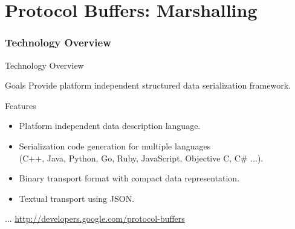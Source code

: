 \part{Protocol Buffers: Marshalling}


\section{Technology Overview}




\begin{frame}{Technology Overview}
    \begin{block}{Goals}
        Provide platform independent structured data serialization framework.
    \end{block}

    \bigskip

    \begin{block}{Features}
        \begin{itemize}
            \item Platform independent data description language.
            \item Serialization code generation for multiple languages \\
                  (C++, Java, Python, Go, Ruby, JavaScript, Objective C, C\# ...).
            \item Binary transport format with compact data representation.
            \item Textual transport using JSON.
        \end{itemize}
    \end{block}

    \bigskip

    \hfill ... \url{http://developers.google.com/protocol-buffers}
\end{frame}


